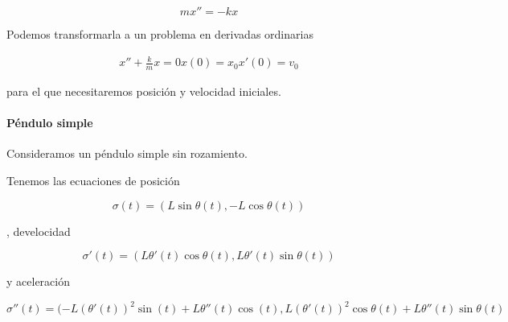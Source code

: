 \documentclass{mathnotes}
\begin{document}
\begin{equation}
mx'' = -kx
\end{equation}

Podemos transformarla a un problema en derivadas ordinarias

\begin{align*}
x'' + \frac{k}{m}x = 0
x(0) = x_0
x'(0) = v_0
\end{align*}

para el que necesitaremos posición y velocidad iniciales.

\paragraph{Péndulo simple}

Consideramos un péndulo simple sin rozamiento.

\begin{figure}
\end{figure}

Tenemos las ecuaciones de posición

\[ σ(t) = (L\sin θ(t), - L \cos θ(t))\]

, develocidad

\[ σ'(t) = (Lθ'(t)\cos θ(t), Lθ'(t)\sin θ(t))\]

y aceleración

\[ σ''(t) = (-L(θ'(t))^2\sin(t) + Lθ''(t)\cos(t), L(θ'(t))^2\cos θ(t) + Lθ''(t)\sin θ(t) \]





\printindex
\end{document}
